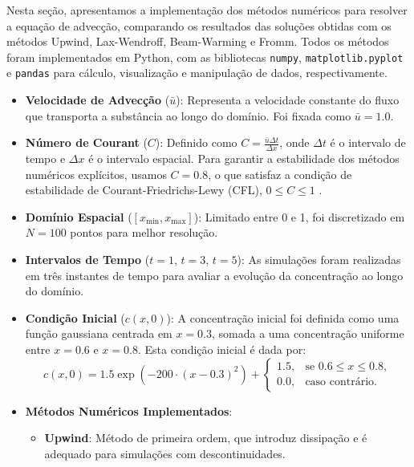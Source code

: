 \documentclass{article}
\begin{document}
Nesta seção, apresentamos a implementação dos métodos numéricos para resolver a equação de advecção, comparando os resultados das soluções obtidas com os métodos Upwind, Lax-Wendroff, Beam-Warming e Fromm. Todos os métodos foram implementados em Python, com as bibliotecas \texttt{numpy}, \texttt{matplotlib.pyplot} e \texttt{pandas} para cálculo, visualização e manipulação de dados, respectivamente.

\begin{itemize}
    \item \textbf{Velocidade de Advecção} (\( \bar{u} \)): Representa a velocidade constante do fluxo que transporta a substância ao longo do domínio. Foi fixada como \(\bar{u} = 1.0\).
    \item \textbf{Número de Courant} (\(C\)): Definido como \(C = \frac{\bar{u} \Delta t}{\Delta x}\), onde \(\Delta t\) é o intervalo de tempo e \(\Delta x\) é o intervalo espacial. Para garantir a estabilidade dos métodos numéricos explícitos, usamos \(C = 0.8\), o que satisfaz a condição de estabilidade de Courant-Friedrichs-Lewy (CFL), \(0 \leq C \leq 1\) \cite{leveque2002finite, fletcher1991computational}.
    \item \textbf{Domínio Espacial} (\([x_{\text{min}}, x_{\text{max}}]\)): Limitado entre 0 e 1, foi discretizado em \(N = 100\) pontos para melhor resolução.
    \item \textbf{Intervalos de Tempo} (\(t=1\), \(t=3\), \(t=5\)): As simulações foram realizadas em três instantes de tempo para avaliar a evolução da concentração ao longo do domínio.
    \item \textbf{Condição Inicial} (\(c(x, 0)\)): A concentração inicial foi definida como uma função gaussiana centrada em \(x = 0.3\), somada a uma concentração uniforme entre \(x = 0.6\) e \(x = 0.8\). Esta condição inicial é dada por:
    \begin{equation}
        c(x, 0) = 1.5 \exp(-200 \cdot (x - 0.3)^2) + 
        \begin{cases}
            1.5, & \text{se } 0.6 \leq x \leq 0.8, \\
            0.0, & \text{caso contrário}.
        \end{cases}
    \end{equation}
    \item \textbf{Métodos Numéricos Implementados}:
    \begin{itemize}
        \item \textbf{Upwind}: Método de primeira ordem, que introduz dissipação e é adequado para simulações com descontinuidades.

\end{itemize}
\end{itemize}
\end{document}
